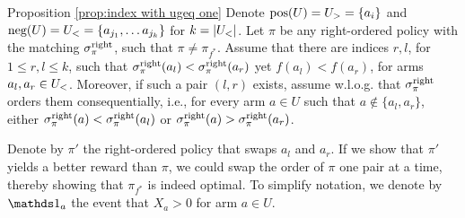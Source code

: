 \begin{proofof}{Proposition \ref{prop:index with ugeq one}}
Denote $\textnormal{pos}(U)=U_>=\{a_{i}\}$  and $\textnormal{neg}(U)=U_<=\{a_{j_1},\dots a_{j_k}\}$ for $k=\left| U_< \right|$. Let $\pi$ be any right-ordered policy with the matching $\sigma^{\textnormal{right}}_\pi$, such that $\pi\neq \pi_{f^*}$. Assume that there are indices $r,l$, for $1\leq r,l \leq k$, such that $\sigma^{\textnormal{right}}_\pi(a_{l})<\sigma^{\textnormal{right}}_\pi(a_{r})$ yet $f(a_{l})<f(a_{{r}})$, for arms $a_l,a_r\in U_<$. Moreover, if such a pair $(l,r)$ exists,  assume w.l.o.g. that $\sigma^{\textnormal{right}}_\pi$ orders them consequentially, i.e., for every arm $a\in U$ such that $a\notin \{ a_{l}, a_{r} \}$,  either $\sigma^{\textnormal{right}}_\pi(a)< \sigma^{\textnormal{right}}_\pi(a_{l})$ or $\sigma^{\textnormal{right}}_\pi(a)> \sigma^{\textnormal{right}}_\pi(a_{r})$.


Denote by $\pi'$ the right-ordered policy that swaps $a_{l}$ and $a_{r}$. If we show that $\pi'$ yields a better reward than $\pi$, we could swap the order of $\pi$ one pair at a time, thereby showing that $\pi_{f^*}$ is indeed optimal. To simplify notation, we denote by $\ind_{a}$ the event that $X_a>0$ for arm $a\in U$.



\end{proofof}
